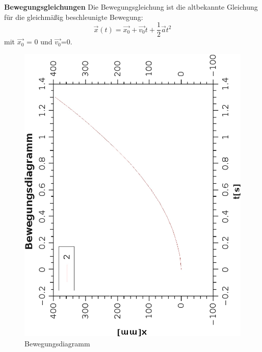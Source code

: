 \documentclass{article}
\begin{document}
\textbf{Bewegungsgleichungen}
Die Bewegungsgleichung ist die altbekannte Gleichung für die gleichmäßig beschleunigte Bewegung:
\begin{equation}
\vec{x}(t)=\vec{x_0}+\vec{v_0}t+\frac{1}{2}\vec{a}t^2
\end{equation} 
mit $\vec{x_0}$ = 0 und $\vec{v_0}$=0.
\begin{figure}[H]
\caption{Bewegungsdiagramm}
\begin{center}
\includegraphics[scale=0.7,angle=-90]{glmbeschlBewegDiag.eps}
\end{center}
\end{figure}
\end{document}

